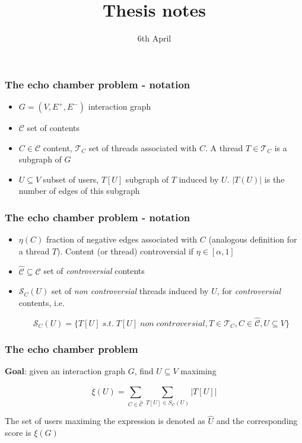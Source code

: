 \documentclass{beamer}
\title{Thesis notes}
\date{6th April}
\begin{document}
\frame{\titlepage}

\begin{frame}[c]
	\frametitle{The echo chamber problem - notation}
	\begin{itemize}
		\item $G = (V, E ^{+}, E ^{-}) $ interaction graph
		\item $ \mathcal{C} $ set of contents
		\item $C \in \mathcal{C} $ content, $\mathcal{T} _{C} $ set of threads
		      associated with $C$. A thread $T \in \mathcal{T} _{C} $ is a
		      subgraph of $G$
		\item $U \subseteq V$ subset of users, $T[U]$ subgraph of $T$ induced
		      by $U$. $|T(U)|$ is the number of edges of this subgraph
	\end{itemize}
\end{frame}

\begin{frame}[c]
	\frametitle{The echo chamber problem - notation}
	\begin{itemize}
		\item $\eta(C)$ fraction of negative edges associated with $C$
		      (analogous definition for a thread $T$). Content (or thread)
		      controversial if $\eta \in [\alpha, 1]$
		\item $\hat{\mathcal{C} } \subseteq \mathcal{C} $ set of \textit{controversial}
		      contents

		\item $\mathcal{S} _C (U)$ set of \textit{non controversial} threads
		      induced by $U$, for \textit{controversial} contents, i.e.

			      {\small
				      \begin{equation}
					      \mathcal{S} _{C} (U) = \{ T[U] \; s.t. \; T[U] \; non \;
					      controversial, T \in \mathcal{T} _{C}, C
					      \in \hat{\mathcal{C}}, U \subseteq V\}
				      \end{equation}
			      }
	\end{itemize}

\end{frame}

\begin{frame}[c]
	\frametitle{The echo chamber problem}
	\textbf{Goal}: given an interaction graph $G$, find $U \subseteq V$ maximing

	\begin{equation}
		\xi (U) = \sum^{}_{C \in \hat{\mathcal{C}} } \sum^{}_{T[U] \in S_C (U)}
		| T[U] |
	\end{equation}

	The set of users maximing the expression is denoted as $\hat{U}$ and the
	corresponding score is $\xi(G)$
\end{frame}
\end{document}

